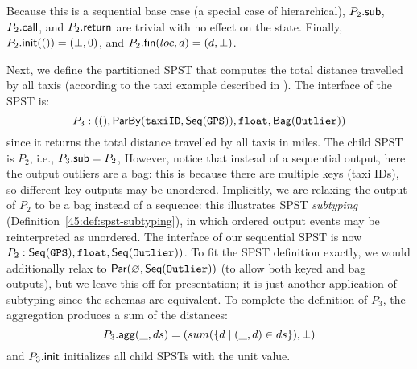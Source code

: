 Because this is a sequential base case
(a special case of hierarchical),
${P_2}.{\mathsf{sub}}$, ${P_2}.{\mathsf{call}}$, and ${P_2}.{\mathsf{return}}$
are trivial with no effect on the state.
Finally, ${P_2}.{\mathsf{init}}(()) = (\bot, 0)$,
and ${P_2}.{\mathsf{fin}}(loc, d) = (d, \bot)$.

Next, we define the partitioned SPST that computes the total distance travelled by all taxis (according to the taxi example described in ).
%
The interface of the SPST is:
\[
P_3:
((),
    \mathsf{ParBy}({\texttt{taxiID}}, \mathsf{Seq}({ \texttt{GPS} })),
    \texttt{float},
    \mathsf{Bag}({\texttt{Outlier}}))
\]
since it returns the total distance travelled by all taxis in miles.
The child SPST is $P_2$, i.e., ${P_3}.{\mathsf{sub}} = P_2$,
However, notice that instead of a sequential output, here the output outliers
are a bag: this is because there are multiple keys (taxi IDs),
so different key outputs may be unordered.
Implicitly, we are relaxing the output of $P_2$ to be a bag instead of a sequence:
this illustrates SPST \emph{subtyping} (Definition~\ref{45:def:spst-subtyping}),
in which ordered output events may be reinterpreted as unordered.
The interface of our sequential SPST is now
$P_2: \mathsf{Seq}({ \texttt{GPS} }), \texttt{float}, \mathsf{Seq}({ \texttt{Outlier} }))$.
To fit the SPST definition exactly,
we would additionally relax to $\mathsf{Par}({\varnothing}, {\mathsf{Seq}({ \texttt{Outlier} })})$
(to allow both keyed and bag outputs),
but we leave this off for presentation;
it is just another application of subtyping since the schemas are equivalent.
To complete the definition of $P_3$,
the aggregation
produces a sum of the distances:
\[
{P_3}.{\mathsf{agg}}(\_, ds) = (sum( \{ d \mid (\_, d) \in ds \} ), \bot{})
\]
and ${P_3}.{\mathsf{init}}$ initializes all child SPSTs with the unit value.

